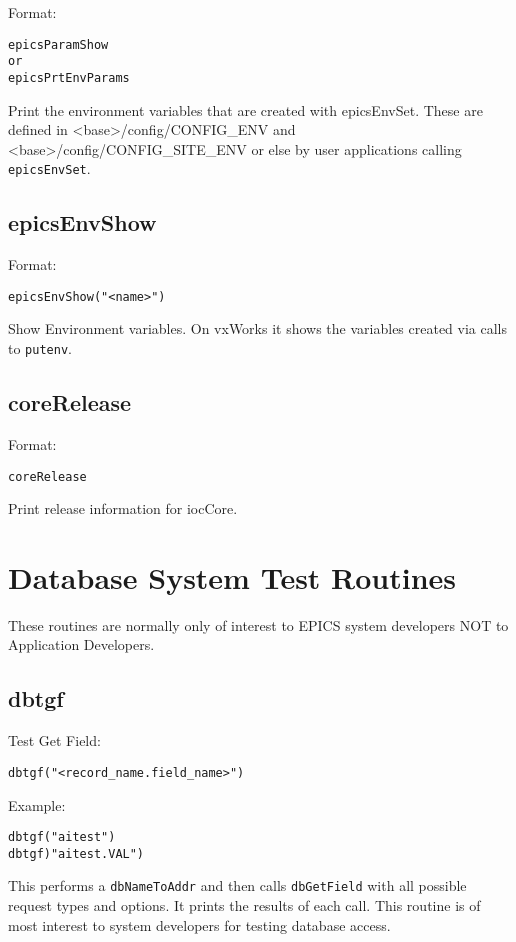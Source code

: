 Format:

\begin{verbatim}epicsParamShow
or
epicsPrtEnvParams
\end{verbatim}Print the environment variables that are created with epicsEnvSet. These are defined in \textless{}base\textgreater{}/config/CONFIG\_ENV 
and \textless{}base\textgreater{}/config/CONFIG\_SITE\_ENV or else by user applications calling \verb|epicsEnvSet|.

\subsection{epicsEnvShow}

Format:

\begin{verbatim}epicsEnvShow("<name>")
\end{verbatim}Show Environment variables. On vxWorks it shows the variables created via calls to \verb|putenv|.

\subsection{coreRelease}

Format:

\begin{verbatim}coreRelease
\end{verbatim}Print release information for iocCore.

\section{Database System Test Routines}

These routines are normally only of interest to EPICS system developers NOT to Application Developers.

\subsection{dbtgf}

Test Get Field:

\begin{verbatim}dbtgf("<record_name.field_name>")
\end{verbatim}Example:

\begin{verbatim}dbtgf("aitest")
dbtgf)"aitest.VAL")
\end{verbatim}This performs a \verb|dbNameToAddr| and then calls \verb|dbGetField| with all possible request types and options. It prints the 
results of each call. This routine is of most interest to system developers for testing database access.


